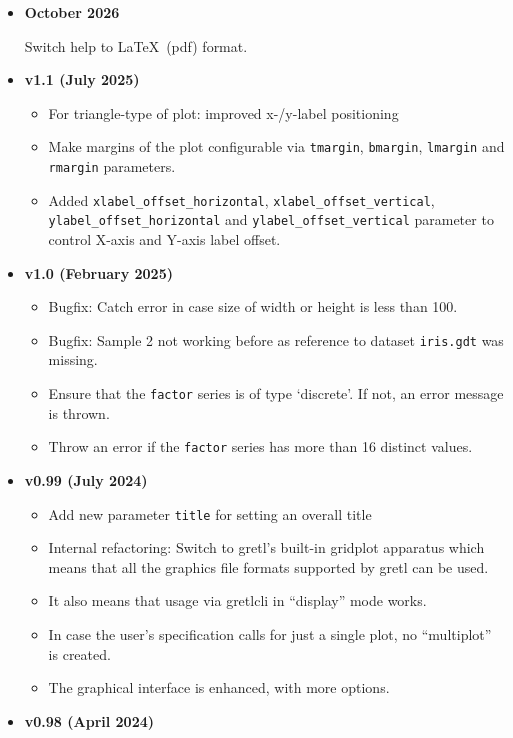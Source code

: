 \documentclass{article}
\newcommand{\tightlist}{}
\begin{document}
\begin{itemize}
\tightlist
\item
  \textbf{October 2026}
  
  Switch help to \LaTeX\ (pdf) format.
  
\item
  \textbf{v1.1 (July 2025)}

  \begin{itemize}
  \tightlist
  \item
    For triangle-type of plot: improved x-/y-label positioning
  \item
    Make margins of the plot configurable via \texttt{tmargin},
    \texttt{bmargin}, \texttt{lmargin} and \texttt{rmargin} parameters.
  \item
    Added \texttt{xlabel\_offset\_horizontal},
    \texttt{xlabel\_offset\_vertical},
    \texttt{ylabel\_offset\_horizontal} and
    \texttt{ylabel\_offset\_vertical} parameter to control X-axis and
    Y-axis label offset.
  \end{itemize}
\item
  \textbf{v1.0 (February 2025)}

  \begin{itemize}
  \tightlist
  \item
    Bugfix: Catch error in case size of width or height is less than
    100.
  \item
    Bugfix: Sample 2 not working before as reference to dataset
    \texttt{iris.gdt} was missing.
  \item
    Ensure that the \texttt{factor} series is of type `discrete'. If
    not, an error message is thrown.
  \item
    Throw an error if the \texttt{factor} series has more than 16
    distinct values.
  \end{itemize}
\item
  \textbf{v0.99 (July 2024)}

  \begin{itemize}
  \tightlist
  \item
    Add new parameter \texttt{title} for setting an overall title
  \item
    Internal refactoring: Switch to gretl's built-in gridplot apparatus
    which means that all the graphics file formats supported by gretl
    can be used.
  \item
    It also means that usage via gretlcli in ``display'' mode works.
  \item
    In case the user's specification calls for just a single plot, no
    ``multiplot'' is created.
  \item
    The graphical interface is enhanced, with more options.
  \end{itemize}
\item
  \textbf{v0.98 (April 2024)}


\end{itemize}
\end{document}
